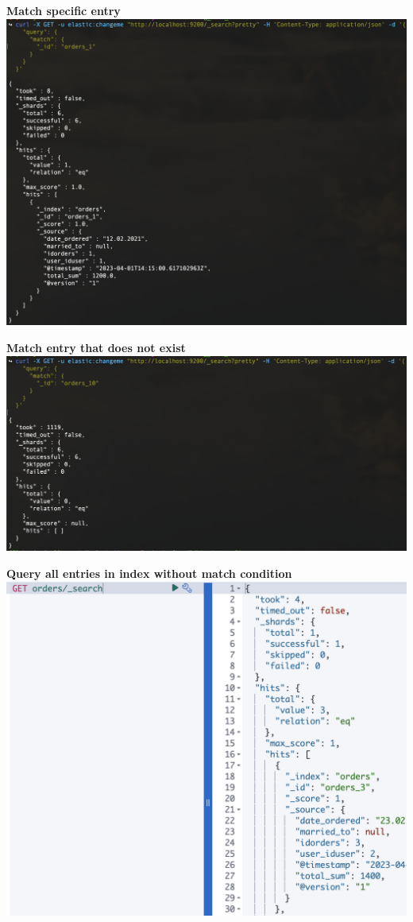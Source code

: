 \documentclass[14pt,a4paper]{extarticle}
\begin{document}
	\noindent \textbf{Match specific entry} \\
	\includegraphics[width=\textwidth]{images/exists.png}

	\noindent \textbf{Match entry that does not exist} \\
	\includegraphics[width=\textwidth]{images/not_exists.png}

	\noindent \textbf{Query all entries in index without match condition} \\
	\includegraphics[height=0.42\textheight]{images/search_all.png}
\end{document}
